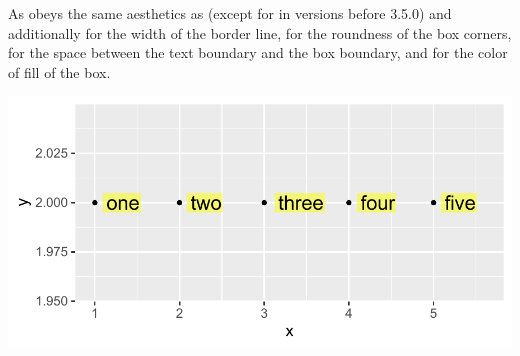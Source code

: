 \documentclass[krantz2]{krantz}\usepackage{knitr}
\begin{document}
As  obeys the same aesthetics as  (except for  in \ggplot versions before 3.5.0) and additionally  for the width of the border line,  for the roundness of the box corners,  for the space between the text boundary and the box boundary, and  for the color of fill of the box.

\label{start:plot:label}
\begin{knitrout}\footnotesize
{}\color{fgcolor}\begin{kframe}
\begin{alltt}
 \hlkwb{<-}
  \hlstd{(} \hlstd{=} \hlopt{:}\hlstd{,}  \hlstd{=} \hlstd{(}\hlstd{,} \hlstd{),}
              \hlstd{=} \hlstd{(}\hlstd{,} \hlstd{,} \hlstd{,} \hlstd{,} \hlstd{))}

\hlstd{(} 
        \hlstd{=}    \hlopt{+}
  \hlstd{(} \hlstd{=} \hlopt{-}\hlstd{,}  \hlstd{=} \hlstd{,}
              \hlstd{=} \hlstd{,}
              \hlstd{=} \hlstd{(}\hlstd{,} \hlstd{),}
              \hlstd{=} \hlstd{(}\hlstd{,} \hlstd{),}
              \hlstd{=} \hlstd{,}  \hlstd{=} \hlstd{)} \hlopt{+}
  \hlstd{()} \hlopt{+}
  \hlstd{(} \hlstd{=} \hlstd{)}
\end{alltt}
\end{kframe}

{\centering \includegraphics[width=.7\textwidth]{figure/pos-label-plot-01-1} 

}


\end{knitrout}
\end{document}
